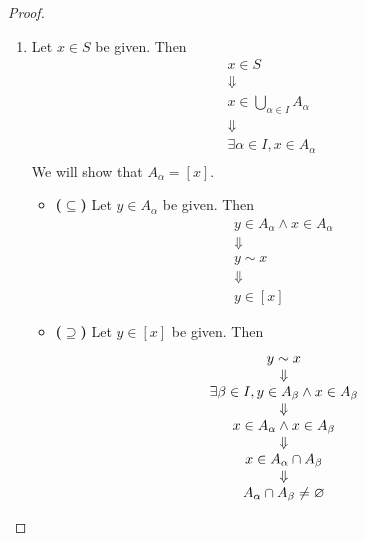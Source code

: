 \begin{proof}
\begin{enumerate}[label=\textbf{(\Alph*)}]
\begin{itemize}
\[\begin{array}{c}
            \Downarrow \\
            x \in A_{\alpha} \land z \in A_{\alpha} \\
            \Downarrow \\
            x \sim z
            \end{array}
            \]
        \end{itemize}
        \item Let $x \in S$ be given. Then
        \[
        \begin{array}{c}
            x \in S \\
            \Downarrow \\
            x \in \bigcup_{\alpha \in I} A_{\alpha} \\
            \Downarrow \\
            \exists \alpha \in I, x \in A_{\alpha} \\
        \end{array}
        \]
        We will show that $A_{\alpha} = [x]$.
        \begin{itemize}
            \item \textbf{($\subseteq$)} Let $y \in A_{\alpha}$ be given. Then
            \[
            \begin{array}{c}
                y \in A_{\alpha} \land x \in A_{\alpha} \\
                \Downarrow \\
                y \sim x \\
                \Downarrow \\
                y \in [x]
            \end{array}
            \]
            \item \textbf{($\supseteq$)} Let $y \in [x]$ be given. Then
            \[
            \begin{array}{c}
                y \sim x \\
                \Downarrow \\
                \exists \beta \in I, y \in A_{\beta} \land x \in A_{\beta} \\
                \Downarrow \\
                x \in A_{\alpha} \land x \in A_{\beta} \\
                \Downarrow \\
                x \in A_{\alpha} \cap A_{\beta} \\
                \Downarrow \\
                A_{\alpha} \cap A_{\beta} \neq \varnothing \\

\end{array}\]
\end{itemize}
\end{enumerate}
\end{proof}
